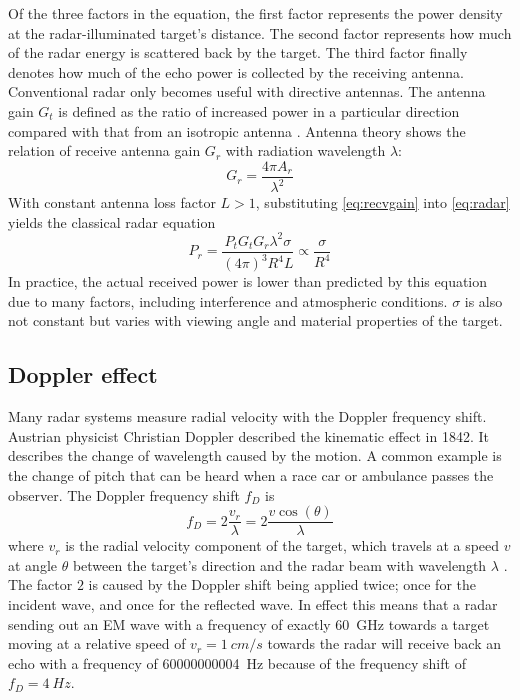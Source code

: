 Of the three factors in the equation, the first
factor represents the power density at the radar-illuminated target's
distance. The second factor represents how much of the radar energy is
scattered back by the target. The third factor finally denotes how much
of the echo power is collected by the receiving antenna.
\cite{Skolnik2008} Conventional radar only becomes useful with directive
antennas. The antenna gain \(G_t\) is defined as the ratio of increased
power in a particular direction compared with that from an isotropic
antenna \cite{Adams2012}. Antenna theory shows \cite{Balanis2015} the
relation of receive antenna gain \(G_r\) with radiation wavelength
\(\lambda\):
\begin{equation} \label{eq:recvgain}
    G_r = \frac{4\pi A_r}{\lambda^2}    
\end{equation}
With constant antenna loss factor \(L>1\), substituting \cref{eq:recvgain} into \cref{eq:radar}
yields the classical radar equation
\begin{equation} \label{eq:radarclassical}
    P_r =
    \frac{P_t G_t G_r \lambda^2 \sigma}{(4\pi)^3R^4L}
    \propto \frac{\sigma}{R^4}
\end{equation}
In practice, the actual received power is lower than predicted by
this equation due to many factors, including interference and
atmospheric conditions. \(\sigma\) is also not constant but varies with
viewing angle and material properties of the target. \cite{Adams2012}

\subsection{Doppler effect}\label{doppler-effect}

Many radar systems measure radial velocity with the Doppler frequency
shift. Austrian physicist Christian Doppler described the kinematic
effect in 1842. It describes the change of wavelength caused by the
motion. A common example is the change of pitch that can be heard when a
race car or ambulance passes the observer. The Doppler frequency shift
\(f_D\) is
\begin{equation} \label{eq:doppler}
    f_D = 2 \frac{v_r}{\lambda} = 2 \frac{v \cos ( \theta )}{\lambda}
\end{equation}
where \(v_r\) is the radial velocity component of the target, which
travels at a speed \(v\) at angle \(\theta\) between the target's
direction and the radar beam with wavelength \(\lambda\)
\cite{Skolnik2008}. The factor \(2\) is caused by the Doppler shift
being applied twice; once for the incident wave, and once for the
reflected wave. In effect this means that a radar sending out an EM wave
with a frequency of exactly \SI{60}{GHz} towards a target moving at a
relative speed of \(v_r = \SI[per-mode=symbol]{1}{cm\per s}\) towards the radar will receive
back an echo with a frequency of \SI{60000000004}{Hz} because of the
frequency shift of \(f_D = \SI{4}{Hz}\).

